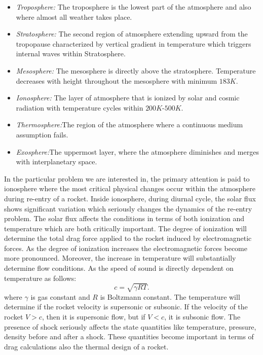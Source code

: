 \documentclass[12pt]{report}
\begin{document}
\begin{itemize}
   \item \emph{ \color{blue} Troposphere:} {\small The troposphere is the lowest part of the atmosphere and  also where almost all weather takes place.} 
   \item \emph{ \color{blue} Stratosphere:} {\small The second region of atmosphere extending upward from the tropopause characterized by vertical gradient in temperature which triggers internal waves within Stratosphere. }
   \item \emph{ \color{blue} Mesosphere:} {\small The mesosphere is directly above the stratosphere. Temperature decreases with height throughout the mesosphere with minimum $183K$.}
   \item \emph{ \color{blue}Ionosphere:} {\small The layer of atmosphere that is ionized by solar and cosmic radiation with temperature cycles within $200K$-$500K$.}
   \item \emph{ \color{blue} Thermosphere:}{\small The region of the atmosphere where a continuous medium assumption fails.}
   \item \emph{ \color{blue} Exosphere:}{\small The uppermost layer, where the atmosphere diminishes and merges with interplanetary space.}
   \end{itemize}
In the particular problem we are interested in, the primary attention is paid to ionosphere where the most critical physical changes occur within the atmosphere during re-entry of a rocket. Inside ionosphere, during diurnal cycle, the solar flux shows significant variation\cite{Chen} which seriously changes the dynamics of the re-entry problem. The solar flux affects the conditions in terms of both ionization and temperature which are both critically important. The degree of ionization will determine the total drag force applied to the rocket induced by electromagnetic forces. As the degree of ionization increases the electromagnetic forces become more pronounced. Moreover, the increase in temperature will substantially determine flow conditions. As the speed of sound is directly dependent on temperature as follows:
\begin{equation}
\label{eq:1}
c=\sqrt{\gamma R T}.
\end{equation}
where $\gamma$ is gas constant and $R$ is Boltzmann constant. The temperature will determine if the rocket velocity is supersonic or subsonic. If the velocity of the rocket $V>c$, then it is supersonic flow, but if $V<c$, it is subsonic flow. The presence of shock seriously affects the state quantities like temperature, pressure, density before and after a shock. These quantities become important in terms of drag calculations also the thermal design of a rocket. 
\end{document}
